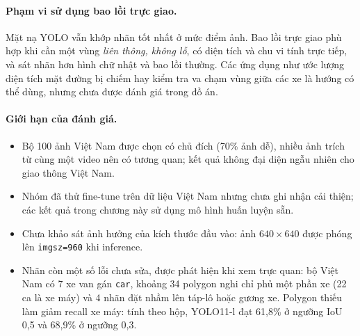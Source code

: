 \paragraph{Phạm vi sử dụng bao lồi trực giao.} Mặt nạ YOLO vẫn khớp nhãn tốt nhất ở mức điểm ảnh.
Bao lồi trực giao phù hợp khi cần một vùng \emph{liên thông, không lỗ}, có diện tích và chu vi tính trực tiếp, và sát nhãn hơn hình chữ nhật và bao lồi thường.
Các ứng dụng như ước lượng diện tích mặt đường bị chiếm hay kiểm tra va chạm vùng giữa các xe là hướng có thể dùng, nhưng chưa được đánh giá trong đồ án.

\paragraph{Giới hạn của đánh giá.}
\begin{itemize}
  \item Bộ 100 ảnh Việt Nam được chọn có chủ đích (70\% ảnh dễ), nhiều ảnh trích từ cùng một video nên có tương quan;
        kết quả không đại diện ngẫu nhiên cho giao thông Việt Nam.
  \item Nhóm đã thử fine-tune trên dữ liệu Việt Nam nhưng chưa ghi nhận cải thiện; các kết quả trong chương này sử dụng mô hình huấn luyện sẵn.
  \item Chưa khảo sát ảnh hưởng của kích thước đầu vào: ảnh $640\times640$ được phóng lên \texttt{imgsz=960} khi inference.
  \item Nhãn còn một số lỗi chưa sửa, được phát hiện khi xem trực quan: bộ Việt Nam có 7 xe van gán \texttt{car},
        khoảng 34 polygon nghi chỉ phủ một phần xe (22 ca là xe máy) và 4 nhãn đặt nhầm lên táp-lô hoặc gương xe. Polygon thiếu làm giảm recall xe máy:
        tính theo hộp, YOLO11-l đạt 61,8\% ở ngưỡng IoU 0,5 và 68,9\% ở ngưỡng 0,3.
\end{itemize}
